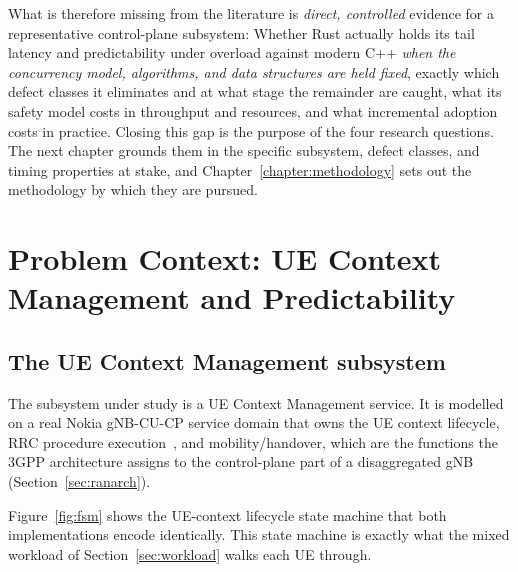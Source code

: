 \documentclass[english,oneside,a4paper,censored,csm,software-track-2020]{HYthesisML}
\begin{document}
What is therefore missing from the literature
is \emph{direct, controlled} evidence for a representative control-plane subsystem: Whether
Rust actually holds its tail latency and predictability under overload against modern C++
\emph{when the concurrency model, algorithms, and data structures are held fixed},
exactly which defect classes it eliminates and at what stage the remainder are caught, what
its safety model costs in throughput and resources, and what incremental adoption costs in
practice. Closing this gap is the purpose of the four research questions. The next chapter
grounds them in the specific subsystem, defect classes, and timing properties at stake, and
Chapter~\ref{chapter:methodology} sets out the methodology by which they are pursued.

\chapter{Problem Context: UE Context Management and Predictability\label{chapter:context}}

\section{The UE Context Management subsystem}\label{sec:uecm}
The subsystem under study is a UE Context Management service. It is modelled on a real Nokia
gNB-CU-CP service domain that owns the UE context lifecycle, RRC procedure
execution~\cite{3gpp38331}, and mobility/handover, which are the functions the 3GPP architecture
assigns to the control-plane part of a disaggregated gNB (Section~\ref{sec:ranarch}).

Figure~\ref{fig:fsm} shows the UE-context lifecycle state machine that both implementations
encode identically. This state machine is exactly what the mixed workload
of Section~\ref{sec:workload} walks each UE through.
\end{document}
